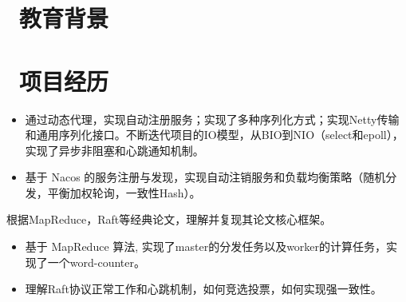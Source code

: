 \documentclass{resume}
\begin{document}
\section{\faGraduationCap\  教育背景}

\vspace{1ex}


\section{\faUsers\ 项目经历}
\begin{itemize}
  \item 通过动态代理，实现自动注册服务；实现了多种序列化方式；实现Netty传输和通用序列化接口。不断迭代项目的IO模型，从BIO到NIO（select和epoll），实现了异步非阻塞和心跳通知机制。
  \item 基于 Nacos 的服务注册与发现，实现自动注销服务和负载均衡策略（随机分发，平衡加权轮询，一致性Hash）。
\end{itemize}

\vspace{-1.5ex}

\begin{onehalfspacing}
根据MapReduce，Raft等经典论文，理解并复现其论文核心框架。
\begin{itemize}
  \item 基于 MapReduce 算法, 实现了master的分发任务以及worker的计算任务，实现了一个word-counter。
  \item 理解Raft协议正常工作和心跳机制，如何竞选投票，如何实现强一致性。
\end{itemize}
\end{onehalfspacing}

\end{document}
